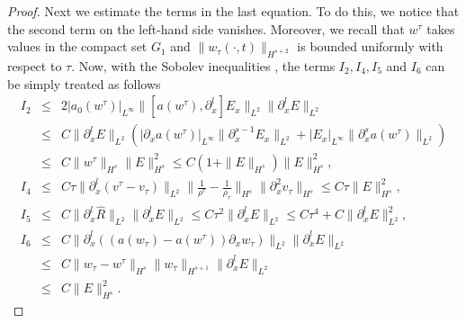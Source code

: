 \documentclass{article}
\theoremstyle{plain}
\begin{document}
\begin{proof}
Next we estimate the terms in the last equation. To do this, we notice that the second term on the left-hand side vanishes. Moreover, we recall that $w^\tau$ takes values in the compact set $G_1$ and $\|w_\tau(\cdot, t)\|_{H^{s+2}}$ is bounded uniformly with respect to $\tau$. Now, with the Sobolev inequalities \cite{majda1984compressible}, the terms $I_2, I_4, I_5$ and $I_6$ can be simply treated as follows
\begin{eqnarray*}
  I_2 &\le& 2 |a_0(w^\tau)|_{L^\infty} \|[a(w^\tau),\partial^l_x]E_x\|_{L^2} \|\partial^l_x E\|_{L^2} \nonumber \\
  &\le& C \|\partial^l_x E\|_{L^2} (|\partial_x a(w^\tau)|_{L^\infty}\|\partial^{s-1}_x E_x\|_{L^2} + |E_x|_{L^\infty} \|\partial^s_x a(w^\tau)\|_{L^2})  \nonumber \\
  &\le& C \|w^\tau\|_{H^s} \|E\|_{H^s}^2 \le C (1+\|E\|_{H^s}) \|E\|_{H^s}^2, \nonumber \\
  I_4 &\le&  C \tau \|\partial^l_x (v^\tau-v_\tau)\|_{L^2} \|\frac{1}{\rho^\tau}-\frac{1}{\rho_\tau}\|_{H^s} \|\partial^2_x v_\tau\|_{H^s}
  \le C \tau \|E\|_{H^s}^2, \nonumber\\
  I_5 &\le& C \|\partial^l_x \hat{R}\|_{L^2} \|\partial^l_x E\|_{L^2} \le C\tau^2\|\partial^l_x E\|_{L^2} \le C \tau^4 + C \|\partial^l_x E\|_{L^2}^2, \nonumber \\
  I_6 &\le& C\|\partial^l_x ((a(w_\tau)-a(w^\tau))\partial_x w_\tau)\|_{L^2} \|\partial^l_x E\|_{L^2}\nonumber\\
      &\le&  C \|w_\tau-w^\tau\|_{H^s} \|w_\tau\|_{H^{s+1}} \|\partial^l_x E\|_{L^2} \nonumber\\
      &\le&  C \|E\|_{H^s}^2. \label{515}
\end{eqnarray*}


\end{proof}
\end{document}
